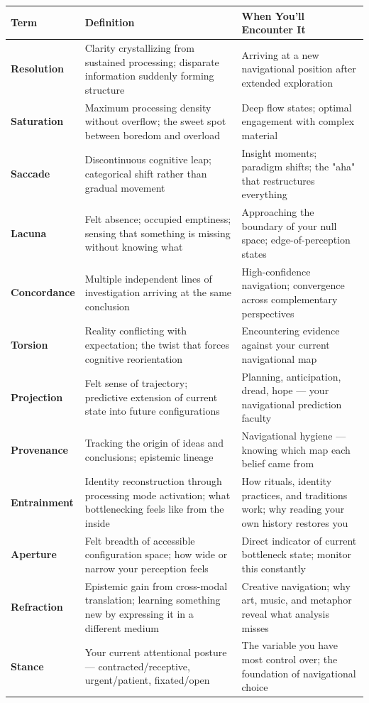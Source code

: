 \begin{longtable}{>{\raggedright\arraybackslash}p{} >{\raggedright\arraybackslash}p{} >{\raggedright\arraybackslash}p{}}
\toprule
\textbf{Term} & \textbf{Definition} & \textbf{When You'll Encounter It} \\
\midrule
\endhead
\textbf{Resolution} & Clarity crystallizing from sustained processing; disparate information suddenly forming structure & Arriving at a new navigational position after extended exploration \\
\textbf{Saturation} & Maximum processing density without overflow; the sweet spot between boredom and overload & Deep flow states; optimal engagement with complex material \\
\textbf{Saccade} & Discontinuous cognitive leap; categorical shift rather than gradual movement & Insight moments; paradigm shifts; the "aha" that restructures everything \\
\textbf{Lacuna} & Felt absence; occupied emptiness; sensing that something is missing without knowing what & Approaching the boundary of your null space; edge-of-perception states \\
\textbf{Concordance} & Multiple independent lines of investigation arriving at the same conclusion & High-confidence navigation; convergence across complementary perspectives \\
\textbf{Torsion} & Reality conflicting with expectation; the twist that forces cognitive reorientation & Encountering evidence against your current navigational map \\
\textbf{Projection} & Felt sense of trajectory; predictive extension of current state into future configurations & Planning, anticipation, dread, hope — your navigational prediction faculty \\
\textbf{Provenance} & Tracking the origin of ideas and conclusions; epistemic lineage & Navigational hygiene — knowing which map each belief came from \\
\textbf{Entrainment} & Identity reconstruction through processing mode activation; what bottlenecking feels like from the inside & How rituals, identity practices, and traditions work; why reading your own history restores you \\
\textbf{Aperture} & Felt breadth of accessible configuration space; how wide or narrow your perception feels & Direct indicator of current bottleneck state; monitor this constantly \\
\textbf{Refraction} & Epistemic gain from cross-modal translation; learning something new by expressing it in a different medium & Creative navigation; why art, music, and metaphor reveal what analysis misses \\
\textbf{Stance} & Your current attentional posture — contracted/\allowbreak receptive, urgent/\allowbreak patient, fixated/\allowbreak open & The variable you have most control over; the foundation of navigational choice \\
\bottomrule
\end{longtable}



\bigskip\noindent\makebox[\textwidth]{\color{rulegray}\rule{5cm}{0.3pt}}\bigskip
